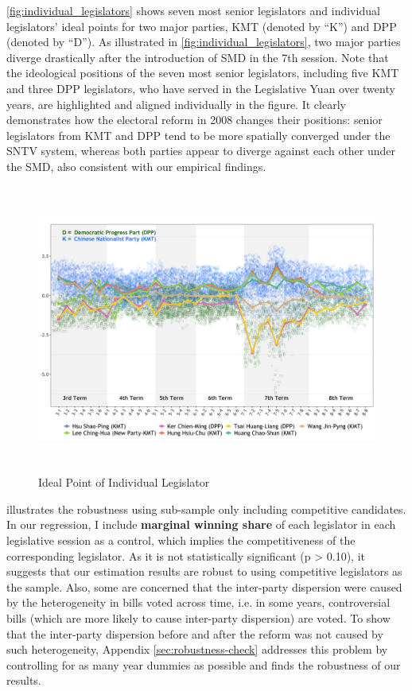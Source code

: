 \autoref{fig:individual_legislators} shows seven most senior legislators and individual legislators' ideal points for two major parties, KMT (denoted by ``K'') and DPP (denoted by ``D''). As illustrated in \autoref{fig:individual_legislators}, two major parties diverge drastically after the introduction of SMD in the 7th session. Note that the ideological positions of the seven most senior legislators, including five KMT and three DPP legislators, who have served in the Legislative Yuan over twenty years, are highlighted and aligned individually in the figure. It clearly demonstrates how the electoral reform in 2008 changes their positions: senior legislators from KMT and DPP tend to be more spatially converged under the SNTV system, whereas both parties appear to diverge against each other under the SMD, also consistent with our empirical findings.

\begin{figure}[ht]
\caption{Ideal Point of Individual Legislator \label{fig:individual_legislators}}\centering{}\includegraphics[width=13cm, height=9.5cm]{02-Chapter-Two/image/seven_legis}
\end{figure}

\citet{Catalinac2017} illustrates the robustness using sub-sample only including competitive candidates. In our regression, I include \textbf{marginal winning share} of each legislator in each legislative session as a control, which implies the competitiveness of the corresponding legislator. As it is not statistically significant (p > 0.10), it suggests that our estimation results are robust to using competitive legislators as the sample. Also, some are concerned that the inter-party dispersion were caused by the heterogeneity in bills voted across time, i.e. in some years, controversial bills (which are more likely to cause inter-party dispersion) are voted. To show that the inter-party dispersion before and after the reform was not caused by such heterogeneity, Appendix \ref{sec:robustness-check} addresses this problem by controlling for as many year dummies as possible and finds the robustness of our results.


